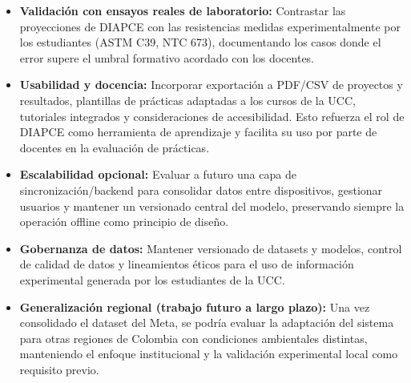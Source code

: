 \begin{itemize}
  \item \textbf{Validación con ensayos reales de laboratorio:} Contrastar las proyecciones de DIAPCE con las resistencias medidas experimentalmente por los estudiantes (ASTM C39, NTC 673), documentando los casos donde el error supere el umbral formativo acordado con los docentes.

  \item \textbf{Usabilidad y docencia:} Incorporar exportación a PDF/CSV de proyectos y resultados, plantillas de prácticas adaptadas a los cursos de la UCC, tutoriales integrados y consideraciones de accesibilidad. Esto refuerza el rol de DIAPCE como herramienta de aprendizaje y facilita su uso por parte de docentes en la evaluación de prácticas.

  \item \textbf{Escalabilidad opcional:} Evaluar a futuro una capa de sincronización/backend para consolidar datos entre dispositivos, gestionar usuarios y mantener un versionado central del modelo, preservando siempre la operación offline como principio de diseño.

  \item \textbf{Gobernanza de datos:} Mantener versionado de datasets y modelos, control de calidad de datos y lineamientos éticos para el uso de información experimental generada por los estudiantes de la UCC.

  \item \textbf{Generalización regional (trabajo futuro a largo plazo):} Una vez consolidado el dataset del Meta, se podría evaluar la adaptación del sistema para otras regiones de Colombia con condiciones ambientales distintas, manteniendo el enfoque institucional y la validación experimental local como requisito previo.
\end{itemize}
